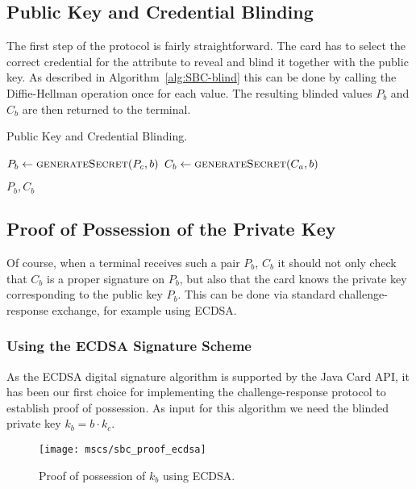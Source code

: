 \subsection{Public Key and Credential Blinding}

The first step of the protocol is fairly straightforward. The card has to
select the correct credential for the attribute to reveal and blind it together
with the public key. As described in Algorithm~\ref{alg:SBC-blind} this can be
done by calling the Diffie-Hellman operation once for each value. The resulting
blinded values $P_b$ and $C_b$ are then returned to the terminal.

\begin{algorithm}
  \caption{Public Key and Credential Blinding.}
  \label{alg:SBC-blind}
  \addtolength{\baselineskip}{1mm}
  \begin{algorithmic}[1]
      \State $P_b \gets \Call{generateSecret}{P_c, b}$
      \State $C_b \gets \Call{generateSecret}{C_a, b}$

      \Return $P_b, C_b$
    \EndFunction
  \end{algorithmic}
\end{algorithm}

\subsection{Proof of Possession of the Private Key}

Of course, when a terminal receives such a pair $P_b$, $C_b$ it should not only
check that $C_b$ is a proper signature on $P_b$, but also that the card knows
the private key corresponding to the public key $P_b$. This can be done via
standard challenge-response exchange, for example using ECDSA.

\subsubsection{Using the ECDSA Signature Scheme}

As the ECDSA digital signature algorithm is supported by the Java Card API, it
has been our first choice for implementing the challenge-response protocol to
establish proof of possession. As input for this algorithm we need the blinded
private key $k_b = b \cdot k_c$.

\begin{figure}[ht]
  \centering
  \texttt{[image: mscs/sbc\_proof\_ecdsa]}
  \caption{Proof of possession of $k_b$ using ECDSA.}
  \label{fig:SBC-proof-ECDSA}
\end{figure}

